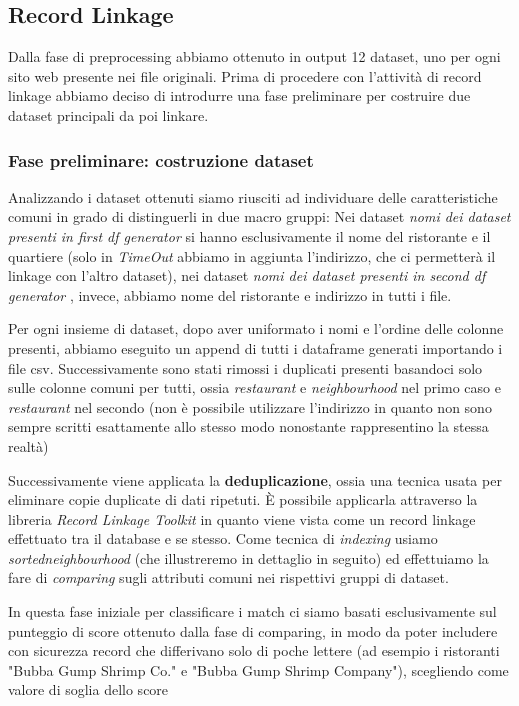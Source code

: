 \documentclass[a4paper,12pt]{article}
\begin{document}
\newpage
\subsection{Record Linkage}
Dalla fase di preprocessing abbiamo ottenuto in output 12 dataset, uno per ogni sito web presente nei file originali. Prima di procedere con l'attività di record linkage abbiamo deciso di introdurre una fase preliminare per costruire due dataset principali da poi linkare.

\subsubsection{Fase preliminare: costruzione dataset}
Analizzando i dataset ottenuti siamo riusciti ad individuare delle caratteristiche comuni in grado di distinguerli in due macro gruppi:
Nei dataset \textit{nomi dei dataset presenti in first df generator} %
si hanno esclusivamente il nome del ristorante e il quartiere (solo in \textit{TimeOut} abbiamo in aggiunta l'indirizzo, che ci permetterà il linkage con l'altro dataset), nei dataset \textit{nomi dei dataset presenti in second df generator} %
, invece, abbiamo nome del ristorante e indirizzo in tutti i file.

Per ogni insieme di dataset, dopo aver uniformato i nomi e l'ordine delle colonne presenti, abbiamo eseguito un append di tutti i dataframe generati importando i file csv. 
Successivamente sono stati rimossi i duplicati presenti basandoci solo sulle colonne comuni per tutti, ossia \textit{restaurant} e \textit{neighbourhood} nel primo caso e \textit{restaurant} nel secondo (non è possibile utilizzare l'indirizzo in quanto non sono sempre scritti esattamente allo stesso modo nonostante rappresentino la stessa realtà) %

Successivamente viene applicata la \textbf{deduplicazione}, ossia una tecnica usata per eliminare copie duplicate di dati ripetuti. È possibile applicarla attraverso la libreria \textit{Record Linkage Toolkit} in quanto viene vista come un record linkage effettuato tra il database e se stesso. Come tecnica di \textit{indexing} usiamo \textit{sortedneighbourhood} (che illustreremo in dettaglio in seguito) ed effettuiamo la fare di \textit{comparing} sugli attributi comuni nei rispettivi gruppi di dataset.

In questa fase iniziale per classificare i match ci siamo basati esclusivamente sul punteggio di score ottenuto dalla fase di comparing, in modo da poter includere con sicurezza record che differivano solo di poche lettere (ad esempio i ristoranti "Bubba Gump Shrimp Co." e "Bubba Gump Shrimp Company"), scegliendo come valore di soglia dello score %
\end{document}
